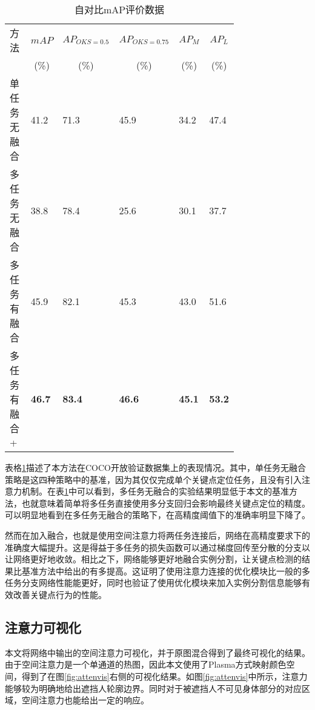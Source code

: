 \begin{table}[ht]
	\centering
	\caption{自对比mAP评价数据}
	\label{tab:mAPCOCOselfbenchmark}
	\begin{minipage}{0.8\linewidth}
		\begin{tabular}{p{0.25\linewidth}p{0.1\linewidth}<{\centering}p{0.1\linewidth}<{\centering}p{0.1\linewidth}<{\centering}p{0.1\linewidth}<{\centering}p{0.1\linewidth}<{\centering}}
			\hline
			方法 & \multicolumn{1}{c}{$mAP$} & \multicolumn{1}{c}{$AP_{OKS=0.5}$} & \multicolumn{1}{c}{$AP_{OKS=0.75}$} 
			& \multicolumn{1}{c}{$AP_M$} & \multicolumn{1}{c}{$AP_L$} \\
			
			& \multicolumn{1}{c}{(\%)}& \multicolumn{1}{c}{(\%)}&
			\multicolumn{1}{c}{(\%)}& \multicolumn{1}{c}{(\%)}& \multicolumn{1}{c}{
				(\%)}\\
			\hline
			单任务无融合 & 41.2 & 71.3 & 45.9& 34.2& 47.4\\
			多任务无融合 & 38.8 & 78.4 & 25.6 & 30.1 & 37.7 \\
			多任务有融合 & 45.9 & 82.1 & 45.3 & 43.0 & 51.6 \\
			多任务有融合+ & \textbf{46.7} & \textbf{83.4} & \textbf{46.6} & \textbf{45.1} & \textbf{53.2} \\
			\hline
		\end{tabular}
	\end{minipage}
\end{table}

表格\ref{tab:mAPCOCOselfbenchmark}描述了本方法在COCO开放验证数据集上的表现情况。其中，单任务无融合策略是这四种策略中的基准，因为其仅仅完成单个关键点定位任务，且没有引入注意力机制。在表\ref{tab:mAPCOCOselfbenchmark}中可以看到，多任务无融合的实验结果明显低于本文的基准方法，也就意味着简单将多任务直接使用多分支回归会影响最终关键点定位的精度。可以明显地看到在多任务无融合的策略下，在高精度阈值下的准确率明显下降了。

然而在加入融合，也就是使用空间注意力将两任务连接后，网络在高精度要求下的准确度大幅提升。这是得益于多任务的损失函数可以通过梯度回传至分散的分支以让网络更好地收敛。相比之下，网络能够更好地融合实例分割，让关键点检测的结果比基准方法中给出的有多提高。这证明了使用注意力连接的优化模块比一般的多任务分支网络性能能更好，同时也验证了使用优化模块来加入实例分割信息能够有效改善关键点行为的性能。

\subsection{注意力可视化}
\label{sec:weaksuperatten}
本文将网络中输出的空间注意力可视化，并于原图混合得到了最终可视化的结果。由于空间注意力是一个单通道的热图，因此本文使用了Plasma方式映射颜色空间，得到了在图\ref{fig:attenvis}右侧的可视化结果。如图\ref{fig:attenvis}中所示，注意力能够较为明确地给出遮挡人轮廓边界。同时对于被遮挡人不可见身体部分的对应区域，空间注意力也能给出一定的响应。

